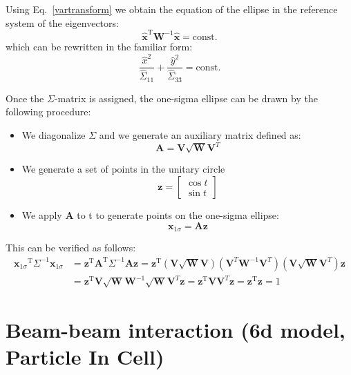 Using Eq.~\ref{vartransform} we obtain the equation of the ellipse in the reference system of the eigenvectors:
\begin{equation}
\hat{\textbf{x}}^\mathrm{T}\textbf{W}^{-1} \hat{\textbf{x}} = \mathrm{const.}
\end{equation}
which can be rewritten in the familiar form:
\begin{equation}
\frac{\hat{x}^2}{\hat{\Sigma}_{11}}+\frac{\hat{y}^2}{\hat{\Sigma}_{33}}=\mathrm{const.}
\end{equation}

Once the $\Sigma$-matrix is assigned, the one-sigma ellipse can be drawn by the following procedure:
\begin{itemize}
\item We diagonalize $\Sigma$ and we generate an auxiliary matrix defined as:
\begin{equation}
\textbf{A} = \textbf{V} \sqrt{\textbf{W}} \textbf{V}^{T}
\end{equation}
\item We generate a set of points in the unitary circle
\begin{equation}
\textbf{z} = \left[
\begin{matrix}
\cos t\\
\sin t
\end{matrix}
\right]
\end{equation}
\item We apply $ \textbf{A} $ to t to generate points on the one-sigma ellipse:
\begin{equation}
\textbf{x}_{1\sigma} = \textbf{A} \textbf{z}
\end{equation}
\end{itemize}

This can be verified as follows:
\begin{align}
{\textbf{x}_{1\sigma}}^\mathrm{T}\Sigma^{-1}\textbf{x}_{1\sigma} 
&= \textbf{z}^\mathrm{T}\textbf{A}^\mathrm{T}\Sigma^{-1}\textbf{A}\textbf{z} = \textbf{z}^\mathrm{T}(\textbf{V} \sqrt{\textbf{W}} \textbf{V})(\textbf{V}^{T} \textbf{W}^{-1} \textbf{V}^{T})(\textbf{V}\sqrt{\textbf{W}} \textbf{V}^{T}) \textbf{z} \nonumber
\\&=\textbf{z}^\mathrm{T}\textbf{V} \sqrt{\textbf{W}}  \textbf{W}^{-1} \sqrt{\textbf{W}} \textbf{V}^{T}\textbf{z}
= \textbf{z}^\mathrm{T}\textbf{V}  \textbf{V}^{T}\textbf{z} 
= \textbf{z}^\mathrm{T}\textbf{z} = 1
\end{align}

\section{Beam-beam interaction (6d model, Particle In Cell)}

